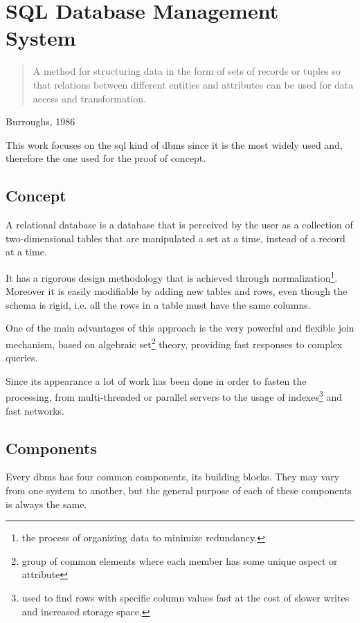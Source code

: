 \section{SQL Database Management System}
\label{sec:rdbms}

\begin{quote}
	A method for structuring data in the form of sets of records or tuples so that relations between different entities and attributes can be used for data access and transformation. 
\end{quote} 
\begin{flushright}Burroughs, 1986\end{flushright}
	
This work focuses on the \ac{sql} kind of \ac{dbms} since it is the most widely used and, therefore the one used for the proof of concept.

\subsection{Concept}
A relational database is a database that is perceived by the user as a collection of two-dimensional tables that are manipulated a set at a time, instead of a record at a time.  

It has a rigorous design methodology that is achieved through normalization\footnote{ the process of organizing data to minimize redundancy.}. Moreover it is easily modifiable by adding new tables and rows, even though the schema is rigid, i.e. all the rows in a table must have the same columns. 

One of the main advantages of this approach is the very powerful and flexible join mechanism, based on algebraic set\footnote{ group of common elements where each member has some unique aspect or attribute} theory, providing fast responses to complex queries.

Since its appearance a lot of work has been done in order to fasten the processing, from multi-threaded or parallel servers to the usage of indexes\footnote{ used to find rows with specific column values fast at the cost of slower writes and increased storage space.} and fast networks. 

\subsection{Components}
Every \ac{dbms}  has four common components, its building blocks. They may vary from one system to another, but the general purpose of each of these components is always the same.

